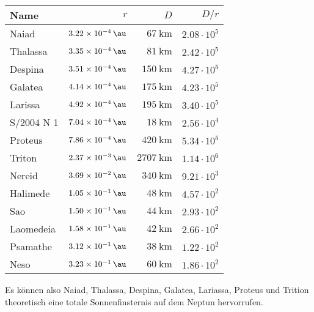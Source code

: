 \documentclass[a4paper,german,12pt,smallheadings]{scrartcl}
\begin{document}
\begin{enumerate}[a)]
    \begin{tabular}{l|r|r|r}
      Name       & $r$                 & $D$                      & $D/r$ \\
      \hline
      Naiad      & $\SI{3.22e-4}{\au}$ & $\SI{67}{\kilo\meter}$   & $2.08 \cdot 10^5$ \\
      Thalassa   & $\SI{3.35e-4}{\au}$ & $\SI{81}{\kilo\meter}$   & $2.42 \cdot 10^5$ \\
      Despina    & $\SI{3.51e-4}{\au}$ & $\SI{150}{\kilo\meter}$  & $4.27 \cdot 10^5$ \\
      Galatea    & $\SI{4.14e-4}{\au}$ & $\SI{175}{\kilo\meter}$  & $4.23 \cdot 10^5$ \\
      Larissa    & $\SI{4.92e-4}{\au}$ & $\SI{195}{\kilo\meter}$  & $3.40 \cdot 10^5$ \\
      S/2004 N 1 & $\SI{7.04e-4}{\au}$ & $\SI{18}{\kilo\meter}$   & $2.56 \cdot 10^4$ \\
      Proteus    & $\SI{7.86e-4}{\au}$ & $\SI{420}{\kilo\meter}$  & $5.34 \cdot 10^5$ \\
      Triton     & $\SI{2.37e-3}{\au}$ & $\SI{2707}{\kilo\meter}$ & $1.14 \cdot 10^6$ \\
      Nereid     & $\SI{3.69e-2}{\au}$ & $\SI{340}{\kilo\meter}$  & $9.21 \cdot 10^3$ \\
      Halimede   & $\SI{1.05e-1}{\au}$ & $\SI{48}{\kilo\meter}$   & $4.57 \cdot 10^2$ \\
      Sao        & $\SI{1.50e-1}{\au}$ & $\SI{44}{\kilo\meter}$   & $2.93 \cdot 10^2$ \\
      Laomedeia  & $\SI{1.58e-1}{\au}$ & $\SI{42}{\kilo\meter}$   & $2.66 \cdot 10^2$ \\
      Psamathe   & $\SI{3.12e-1}{\au}$ & $\SI{38}{\kilo\meter}$   & $1.22 \cdot 10^2$ \\
      Neso       & $\SI{3.23e-1}{\au}$ & $\SI{60}{\kilo\meter}$   & $1.86 \cdot 10^2$ \\
    \end{tabular}

    Es können also Naiad, Thalassa, Despina, Galatea, Lariassa, Proteus und
    Trition theoretisch eine totale Sonnenfinsternis auf dem Neptun
    hervorrufen.



\end{enumerate}
\end{document}
